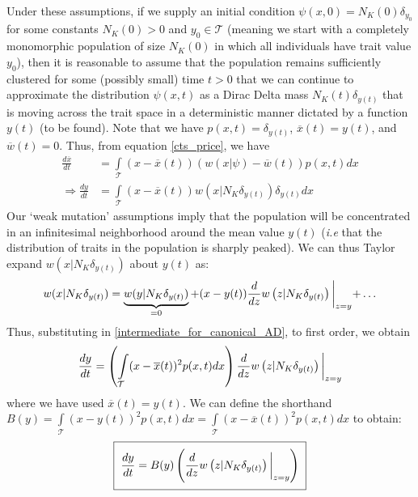 Under these assumptions, if we supply an initial condition $\psi(x,0) = N_{K}(0)\delta_{y_0}$ for some constants $N_K(0) > 0$ and $y_0 \in \mathcal{T}$ (meaning we start with a completely monomorphic population of size $N_K(0)$ in which all individuals have trait value $y_0$), then it is reasonable to assume that the population remains sufficiently clustered for some (possibly small) time $t>0$ that we can continue to approximate the distribution $\psi(x,t)$ as a Dirac Delta mass $N_{K}(t)\delta_{y(t)}$ that is moving across the trait space in a deterministic manner dictated by a function $y(t)$ (to be found). Note that we have $p(x,t) = \delta_{y(t)}$, $\overline{x}(t) = y(t)$, and $\overline{w}(t) = 0$. Thus, from equation \eqref{cts_price}, we have
\begin{align}
    \frac{d\overline{x}}{dt} &= \int\limits_{\mathcal{T}}(x-\overline{x}(t))(w(x|\psi)-\overline{w}(t))p(x,t)dx\nonumber\\
    \Rightarrow \frac{dy}{dt} &= \int\limits_{\mathcal{T}}(x-\overline{x}(t))w\left(x|N_K\delta_{y(t)}\right)\delta_{y(t)}dx\label{intermediate_for_canonical_AD}
\end{align}
Our `weak mutation' assumptions imply that the population will be concentrated in an infinitesimal neighborhood around the mean value $y(t)$ (\emph{i.e} that the distribution of traits in the population is sharply peaked). We can thus Taylor expand $w\left(x|N_K\delta_{y(t)}\right)$ about $y(t)$ as:
\begin{equation*}
    w(x|N_K\delta_{y(t)}) = \underbrace{w(y|N_K\delta_{y(t)})}_{=0} + (x-y(t))\frac{d}{dz}w\left(z|N_K\delta_{y(t)}\right)\biggl{|}_{z=y} + \ldots
\end{equation*}
Thus, substituting in \eqref{intermediate_for_canonical_AD}, to first order, we obtain
\begin{equation*}
    \frac{dy}{dt} = \left(\int\limits_{\mathcal{T}}(x-\overline{x}(t))^2p(x,t)dx\right)\frac{d}{dz}w\left(z|N_K\delta_{y(t)}\right)\biggl{|}_{z=y}
\end{equation*}
where we have used $\overline{x}(t) = y(t)$. We can define the shorthand $B(y) =\int\limits_{\mathcal{T}}(x-y(t))^2p(x,t)dx = \int\limits_{\mathcal{T}}(x-\overline{x}(t))^2p(x,t)dx$ to obtain:
\begin{equation}
    \label{AD_canonical_derived}
    \setlength{\fboxsep}{2\fboxsep}\boxed{\frac{dy}{dt} = B(y)\left(\frac{d}{dz}w\left(z|N_K\delta_{y(t)}\right)\biggl{|}_{z=y}\right)}
\end{equation}
